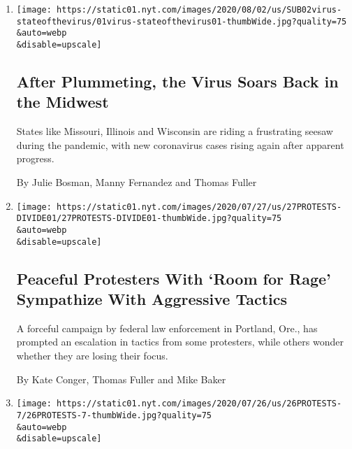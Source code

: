 \begin{enumerate}
\def\labelenumi{\arabic{enumi}.}
\item
  \href{/2020/08/01/us/coronavirus-midwest-cases-deaths.html}{}

  \texttt{[image: https://static01.nyt.com/images/2020/08/02/us/SUB02virus-stateofthevirus/01virus-stateofthevirus01-thumbWide.jpg?quality=75\\\&auto=webp\\\&disable=upscale]}

  \hypertarget{after-plummeting-the-virus-soars-back-in-the-midwest}{%
  \subsection{After Plummeting, the Virus Soars Back in the
  Midwest}\label{after-plummeting-the-virus-soars-back-in-the-midwest}}

  States like Missouri, Illinois and Wisconsin are riding a frustrating
  seesaw during the pandemic, with new coronavirus cases rising again
  after apparent progress.

  By Julie Bosman, Manny Fernandez and Thomas Fuller
\item
  \href{/2020/07/27/us/protests-divisions-blm.html}{}

  \texttt{[image: https://static01.nyt.com/images/2020/07/27/us/27PROTESTS-DIVIDE01/27PROTESTS-DIVIDE01-thumbWide.jpg?quality=75\\\&auto=webp\\\&disable=upscale]}

  \hypertarget{peaceful-protesters-with-room-for-rage-sympathize-with-aggressive-tactics}{%
  \subsection{Peaceful Protesters With `Room for Rage' Sympathize With
  Aggressive
  Tactics}\label{peaceful-protesters-with-room-for-rage-sympathize-with-aggressive-tactics}}

  A forceful campaign by federal law enforcement in Portland, Ore., has
  prompted an escalation in tactics from some protesters, while others
  wonder whether they are losing their focus.

  By Kate Conger, Thomas Fuller and Mike Baker
\item
  \href{/2020/07/26/us/protests-portland-seattle-trump.html}{}

  \texttt{[image: https://static01.nyt.com/images/2020/07/26/us/26PROTESTS-7/26PROTESTS-7-thumbWide.jpg?quality=75\\\&auto=webp\\\&disable=upscale]}

  \hypertarget{cities-in-bind-as-turmoil-spreads-far-beyond-portland}{%
}
\end{enumerate}
